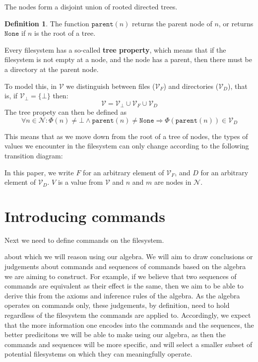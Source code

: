 \documentclass[12pt]{article}
\newcommand{\setv}{\mathcal{V}} %
\newcommand{\setvx}[1]{\mathcal{V}_{#1}}
\newcommand{\setf}{\setvx{F}} %
\newcommand{\setd}{\setvx{D}} %
\newcommand{\setb}{\setvx{\empt}} %
\newcommand{\setn}{\mathcal{N}} %
\newcommand{\empt}{\bot}
\newcommand{\parent}{\mathtt{parent}}
\newcommand{\topnode}{\mathtt{None}} %
\newcommand{\FS}{\Phi} %
\theoremstyle{definition}
\newtheorem{mydef}{Definition}
\begin{document}
The nodes form a disjoint union of rooted directed trees.
\begin{mydef}
The function $\parent(n)$ returns the parent node of $n$, or
returns $\topnode$ if $n$ is the root of a tree.
\end{mydef}

Every filesystem has a so-called \textbf{tree property}, which means that
if the filesystem is not empty at a node, and the node has a parent,
then there must be a directory at the parent node.

To model this, in $\setv$ we distinguish between files ($\setf$) and directories ($\setd$), that is,
if $\setb = \{\empt\}$ then:
\[ \setv = \setb \cup \setf \cup \setd \]
The tree propety can then be defined as
\[ \forall n\in\setn : \FS(n) \neq \empt \wedge \parent(n) \neq \topnode \Rightarrow \FS(\parent(n)) \in \setd \]

This means that as we move down from the root of a tree of nodes,
the types of values we encounter in the filesystem can only change according to the following
transition diagram:



In this paper, we write $F$ for an arbitrary element of $\setf$, and $D$ for an arbitrary element
of $\setd$. $V$ is a value from $\setv$ and $n$ and $m$ are nodes in $\setn$.






\section{Introducing commands}

Next we need to define commands on the filesystem.

 about which we will reason
using our algebra.
We will aim to draw conclusions or judgements about commands and sequences of commands
based on the algebra we are aiming to construct.
For example, if we believe that two sequences of commands are equivalent as their effect
is the same, then we aim to be able to derive this from the axioms and inference rules of the
algebra.
As the algebra operates on commands only,
these judgements, by definition, need to hold regardless of the filesystem the commands are applied to.
Accordingly, we expect that the more information one encodes into the commands and the sequences,
the better predicitons we will be able to make using our algebra,
as then the commands and sequences will be more specific, and will select a smaller subset
of potential filesystems on which they can meaningfully operate.
\end{document}
